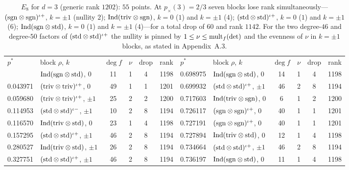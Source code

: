 \documentclass[aps,prx,reprint,superscriptaddress,nobibnotes,longbibliography]{revtex4-2}
\begin{document}
\begin{table}[t]
\caption{$E_8$ for $d=3$ (generic rank $1202$): $55$ points.  At $p_\times(3)=2/3$ seven blocks lose rank simultaneously---$({\rm sgn}\otimes{\rm sgn})^{\iota+}$, $k=\pm1$ (nullity $2$); ${\rm Ind}({\rm triv}\otimes{\rm sgn})$, $k=0$ ($1$) and $k=\pm1$ ($4$); $({\rm std}\otimes{\rm std})^{\iota+}$, $k=0$ ($1$) and $k=\pm1$ ($6$); ${\rm Ind}({\rm sgn}\otimes{\rm std})$, $k=0$ ($1$) and $k=\pm1$ ($4$)---for a total drop of $60$ and rank $1142$.  For the two degree-$46$ and degree-$50$ factors of $({\rm std}\otimes{\rm std})^{\iota+}$ the nullity is pinned by $1\le\nu\le{\rm mult}_f(\det)$ and the evenness of $\nu$ in $k=\pm1$ blocks, as stated in Appendix~A.3.}
\label{tab:S3}
\begin{ruledtabular}
\begin{tabular}{llcccc|llcccc}
$p^*$ & block $\rho$, $k$ & $\deg f$ & $\nu$ & drop & rank & $p^*$ & block $\rho$, $k$ & $\deg f$ & $\nu$ & drop & rank\\
\colrule
0.019707 & ${\rm Ind}({\rm sgn}\otimes{\rm std})$, $0$ & 11 & 1 & 4 & 1198 & 0.698975 & ${\rm Ind}({\rm sgn}\otimes{\rm std})$, $0$ & 14 & 1 & 4 & 1198\\
0.043971 & $({\rm triv}\otimes{\rm triv})^{\iota+}$, $0$ & 49 & 1 & 1 & 1201 & 0.699932 & $({\rm std}\otimes{\rm std})^{\iota+}$, $\pm1$ & 46 & 2 & 8 & 1194\\
0.059680 & $({\rm triv}\otimes{\rm triv})^{\iota+}$, $\pm1$ & 25 & 2 & 2 & 1200 & 0.717603 & ${\rm Ind}({\rm triv}\otimes{\rm sgn})$, $0$ & 6 & 1 & 2 & 1200\\
0.114953 & $({\rm std}\otimes{\rm std})^{\iota-}$, $\pm1$ & 10 & 2 & 8 & 1194 & 0.726117 & $({\rm sgn}\otimes{\rm sgn})^{\iota+}$, $0$ & 40 & 1 & 1 & 1201\\
0.116570 & ${\rm Ind}({\rm triv}\otimes{\rm std})$, $0$ & 23 & 1 & 4 & 1198 & 0.727191 & $({\rm sgn}\otimes{\rm sgn})^{\iota+}$, $0$ & 40 & 1 & 1 & 1201\\
0.157295 & $({\rm std}\otimes{\rm std})^{\iota+}$, $\pm1$ & 46 & 2 & 8 & 1194 & 0.727894 & ${\rm Ind}({\rm triv}\otimes{\rm std})$, $0$ & 12 & 1 & 4 & 1198\\
0.280527 & ${\rm Ind}({\rm triv}\otimes{\rm std})$, $\pm1$ & 26 & 2 & 8 & 1194 & 0.734664 & $({\rm std}\otimes{\rm std})^{\iota+}$, $\pm1$ & 46 & 2 & 8 & 1194\\
0.327751 & $({\rm std}\otimes{\rm std})^{\iota+}$, $\pm1$ & 46 & 2 & 8 & 1194 & 0.736197 & ${\rm Ind}({\rm sgn}\otimes{\rm std})$, $0$ & 11 & 1 & 4 & 1198\\

\end{tabular}
\end{ruledtabular}
\end{table}
\end{document}
